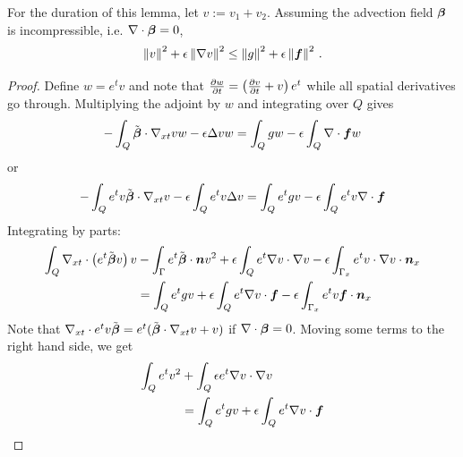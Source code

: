 \documentclass{article}
\begin{document}
\begin{lemma}
\label{lem:l2}
For the duration of this lemma, let $v:=v_1+v_2$.
Assuming the advection field $\boldsymbol\beta$ is incompressible, i.e. $\nabla\cdot\boldsymbol\beta=0$,
\[
\left\| v \right\|^2+\epsilon\left\| \nabla v \right\|^2\leq\left\| g \right\|^2+\epsilon\left\| \boldsymbol f \right\|^2\,.
\]
\end{lemma}
\begin{proof}
Define $w=e^{t}v$ and note that $\frac{\partial w}{\partial t}=\left( \frac{\partial v}{\partial t}+v \right)e^{t}$ while
all spatial derivatives go through.
Multiplying the adjoint by $w$ and integrating over $Q$ gives
\begin{align*}
-\int_Q\tilde{\boldsymbol\beta}\cdot\nabla_{xt} vw-\epsilon\Delta vw=\int_Qgw-\epsilon\int_Q\nabla\cdot\boldsymbol f w
\end{align*}
or
\begin{align*}
-\int_Qe^{t}v\tilde{\boldsymbol\beta}\cdot\nabla_{xt} v-\epsilon\int_Q e^{t}v\Delta v=\int_Qe^{t}gv-\epsilon\int_Qe^{t}v\nabla\cdot\boldsymbol f
\end{align*}
Integrating by parts:
\begin{align*}
\int_Q\nabla_{xt}\cdot\left( e^{t}\tilde{\boldsymbol\beta} v \right)v&
-\int_\Gamma e^{t}\tilde{\boldsymbol\beta}\cdot\boldsymbol n v^2
+\epsilon\int_Qe^{t}\nabla v\cdot\nabla v
-\epsilon\int_{\Gamma_x}e^{t}v\cdot\nabla v\cdot\boldsymbol n_x
\\
&=
\int_Qe^{t}gv
+\epsilon\int_Qe^{t}\nabla v\cdot\boldsymbol f
-\epsilon\int_{\Gamma_x}e^{t}v\boldsymbol f\cdot\boldsymbol n_x
\end{align*}
Note that $\nabla_{xt}\cdot{e^{t}v\tilde{\boldsymbol\beta}}=e^{t}(\tilde{\boldsymbol\beta}\cdot\nabla_{xt} v+v)$ if $\nabla\cdot\boldsymbol\beta=0$.
Moving some terms to the right hand side, we get
\begin{align*}
\int_Q e^{t}v^2
&+\int_Q\epsilon e^{t}\Grad v\cdot\Grad v
\\
&=
\int_Qe^{t}gv
+\epsilon\int_Qe^{t}\Grad v\cdot\bff

\end{align*}
\end{proof}
\end{document}
